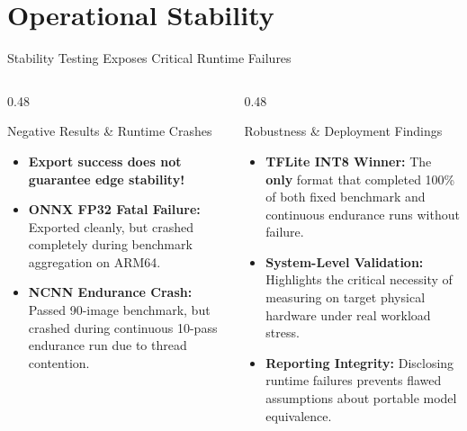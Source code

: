 \documentclass[aspectratio=169,10pt]{beamer}
\begin{document}
\section{Operational Stability}
\begin{frame}{Stability Testing Exposes Critical Runtime Failures}
\begin{columns}[T]
  \begin{column}{0.48\textwidth}
    \begin{block}{\small Negative Results \& Runtime Crashes}
      \small
      \begin{itemize}
        \item \textbf{Export success does not guarantee edge stability!}
        \item \textbf{ONNX FP32 Fatal Failure:} Exported cleanly, but crashed completely during benchmark aggregation on ARM64.
        \item \textbf{NCNN Endurance Crash:} Passed 90-image benchmark, but crashed during continuous 10-pass endurance run due to thread contention.
      \end{itemize}
    \end{block}
  \end{column}
  \begin{column}{0.48\textwidth}
    \begin{block}{\small Robustness \& Deployment Findings}
      \small
      \begin{itemize}
        \item \textbf{TFLite INT8 Winner:} The \textbf{only} format that completed 100\% of both fixed benchmark and continuous endurance runs without failure.
        \item \textbf{System-Level Validation:} Highlights the critical necessity of measuring on target physical hardware under real workload stress.
        \item \textbf{Reporting Integrity:} Disclosing runtime failures prevents flawed assumptions about portable model equivalence.
      \end{itemize}
    \end{block}
  \end{column}
\end{columns}
\end{frame}

\end{document}
